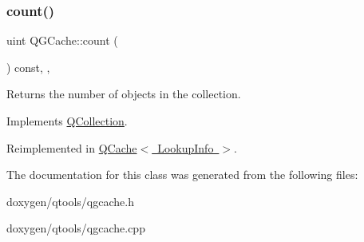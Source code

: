 \subsubsection{\texorpdfstring{count()}{count()}}
{\footnotesize\ttfamily uint Q\+G\+Cache\+::count (\begin{DoxyParamCaption}{ }\end{DoxyParamCaption}) const\hspace{0.3cm}{\ttfamily [inline]}, {\ttfamily [protected]}, {\ttfamily [virtual]}}

Returns the number of objects in the collection. 

Implements \mbox{\hyperlink{class_q_collection_a6441adbfb3ffb6f55ed834c0c0bcc6cb}{Q\+Collection}}.



Reimplemented in \mbox{\hyperlink{class_q_cache_ac2f569c43cd3aeaabf28aef74a1e33b4}{Q\+Cache$<$ Lookup\+Info $>$}}.



The documentation for this class was generated from the following files\+:\begin{DoxyCompactItemize}
\item 
doxygen/qtools/qgcache.\+h\item 
doxygen/qtools/qgcache.\+cpp\end{DoxyCompactItemize}
